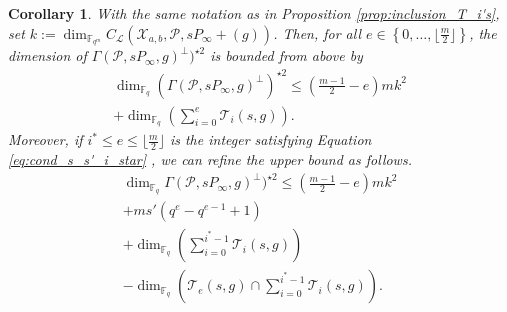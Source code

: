 \documentclass[journal]{IEEEtran}
\theoremstyle{plain}
\newtheorem{coro}[thm]{Corollary}
\theoremstyle{definition}
\theoremstyle{remark}
\newcommand{\calP}{\mathcal{P}}
\newcommand{\calL}{\mathcal{L}}
\newcommand{\calT}{\mathcal{T}}
\newcommand{\calX}{\mathcal{X}}
\newcommand{\fqm}{\mathbb{F}_{q^m}}
\newcommand{\fq}{\mathbb{F}_{q}}
\newcommand{\set}[1]{\left\{#1\right\}}
\begin{document}
	\begin{coro} \label{coro:folklore_upper_bound}
		With the same notation as in Proposition \ref{prop:inclusion_T_i's}, set $k:=\dim_{\fqm}C_{\calL}(\calX_{a,b},\calP,sP_\infty+(g))$.
		Then, for all $e \in \set{0,\dots,\lfloor \frac{m}{2} \rfloor}$, the dimension of $\Gamma(\calP,sP_\infty,g)^{\perp})^{\star 2}$ is bounded from above by
		\begin{multline}
		\dim_{\fq} \left(\Gamma(\calP,sP_\infty,g)^{\perp}\right)^{\star 2} \leq   \left(\frac{m-1}{2}-e\right)mk^2 \\+\dim_{\fq}\left(\sum\limits_{i=0}^e \calT_i(s,g) \right).
	\end{multline}
		Moreover, if $i^* \leq e \leq \lfloor \frac{m}{2} \rfloor$ is the integer satisfying Equation \eqref{eq:cond_s_s'_i_star} , we can refine the upper bound as follows. 
		\begin{multline}
			\dim_{\fq} \Gamma(\calP,sP_\infty,g)^{\perp})^{\star 2} \leq  \left(\frac{m-1}{2}-e\right)mk^2 \\ + ms'(q^e-q^{e-1}+1) 
			\\+ \dim_{\fq}\left(\sum\limits_{i=0}^{i^*-1} \calT_i(s,g)\right) \\- \dim_{\fq} \left( \calT_e(s,g) \cap   \sum\limits_{i=0}^{i^*-1} \calT_i(s,g)\right).
		\end{multline}
		
	\end{coro}
	
\end{document}
